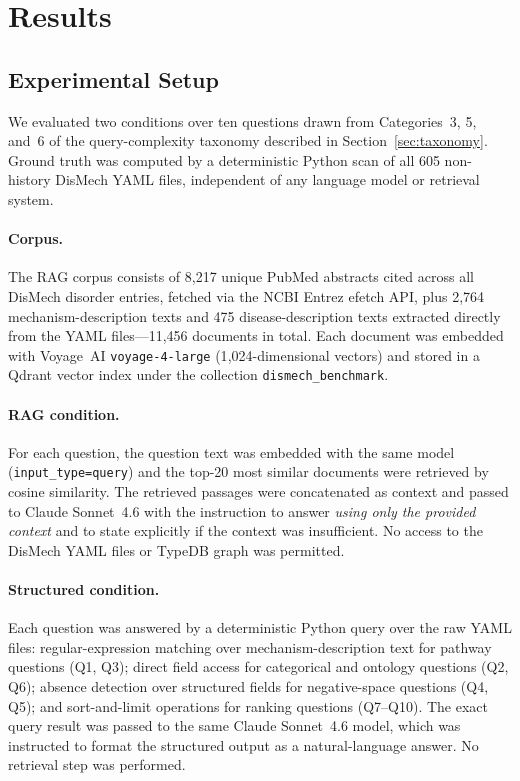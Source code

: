 
\section{Results}
\label{sec:results}

\subsection{Experimental Setup}
\label{sec:results-setup}

We evaluated two conditions over ten questions drawn from Categories~3, 5,
and~6 of the query-complexity taxonomy described in
Section~\ref{sec:taxonomy}. Ground truth was computed by a deterministic
Python scan of all 605 non-history DisMech YAML files, independent of any
language model or retrieval system.

\paragraph{Corpus.}
The RAG corpus consists of 8{,}217 unique PubMed abstracts cited across all
DisMech disorder entries, fetched via the NCBI Entrez efetch API, plus
2{,}764 mechanism-description texts and 475 disease-description texts
extracted directly from the YAML files---11{,}456 documents in total. Each
document was embedded with Voyage~AI \texttt{voyage-4-large}
(1{,}024-dimensional vectors) and stored in a Qdrant vector index under the
collection \texttt{dismech\_benchmark}.

\paragraph{RAG condition.}
For each question, the question text was embedded with the same model
(\texttt{input\_type=query}) and the top-20 most similar documents were
retrieved by cosine similarity. The retrieved passages were concatenated as
context and passed to Claude Sonnet~4.6 with the instruction to answer
\emph{using only the provided context} and to state explicitly if the context
was insufficient. No access to the DisMech YAML files or TypeDB graph was
permitted.

\paragraph{Structured condition.}
Each question was answered by a deterministic Python query over the raw YAML
files: regular-expression matching over mechanism-description text for
pathway questions (Q1, Q3); direct field access for categorical and ontology
questions (Q2, Q6); absence detection over structured fields for negative-space
questions (Q4, Q5); and sort-and-limit operations for ranking questions
(Q7--Q10). The exact query result was passed to the same Claude Sonnet~4.6
model, which was instructed to format the structured output as a natural-language
answer. No retrieval step was performed.

